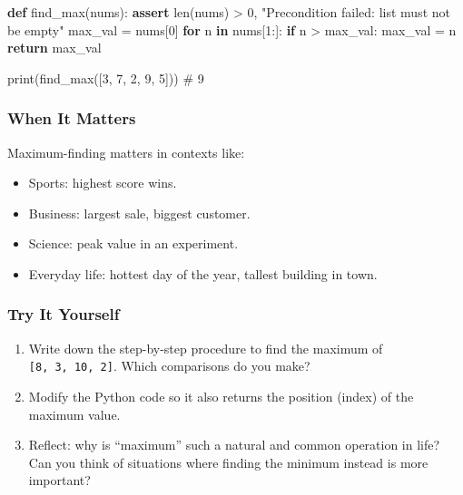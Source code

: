 \documentclass[
  letterpaper,
  DIV=11,
  numbers=noendperiod]{scrreprt}
\newenvironment{Shaded}{\begin{snugshade}}{\end{snugshade}}
\newcommand{\BuiltInTok}[1]{\textcolor[rgb]{0.00,0.23,0.31}{#1}}
\newcommand{\CommentTok}[1]{\textcolor[rgb]{0.37,0.37,0.37}{#1}}
\newcommand{\ControlFlowTok}[1]{\textcolor[rgb]{0.00,0.23,0.31}{\textbf{#1}}}
\newcommand{\DecValTok}[1]{\textcolor[rgb]{0.68,0.00,0.00}{#1}}
\newcommand{\KeywordTok}[1]{\textcolor[rgb]{0.00,0.23,0.31}{\textbf{#1}}}
\newcommand{\NormalTok}[1]{\textcolor[rgb]{0.00,0.23,0.31}{#1}}
\newcommand{\OperatorTok}[1]{\textcolor[rgb]{0.37,0.37,0.37}{#1}}
\newcommand{\StringTok}[1]{\textcolor[rgb]{0.13,0.47,0.30}{#1}}
\providecommand{\tightlist}{%
  \setlength{\itemsep}{0pt}\setlength{\parskip}{0pt}}
\begin{document}
\begin{Shaded}
\begin{Highlighting}[]
\KeywordTok{def}\NormalTok{ find\_max(nums):}
    \ControlFlowTok{assert} \BuiltInTok{len}\NormalTok{(nums) }\OperatorTok{\textgreater{}} \DecValTok{0}\NormalTok{, }\StringTok{"Precondition failed: list must not be empty"}
\NormalTok{    max\_val }\OperatorTok{=}\NormalTok{ nums[}\DecValTok{0}\NormalTok{]}
    \ControlFlowTok{for}\NormalTok{ n }\KeywordTok{in}\NormalTok{ nums[}\DecValTok{1}\NormalTok{:]:}
        \ControlFlowTok{if}\NormalTok{ n }\OperatorTok{\textgreater{}}\NormalTok{ max\_val:}
\NormalTok{            max\_val }\OperatorTok{=}\NormalTok{ n}
    \ControlFlowTok{return}\NormalTok{ max\_val}

\BuiltInTok{print}\NormalTok{(find\_max([}\DecValTok{3}\NormalTok{, }\DecValTok{7}\NormalTok{, }\DecValTok{2}\NormalTok{, }\DecValTok{9}\NormalTok{, }\DecValTok{5}\NormalTok{]))  }\CommentTok{\# 9}
\end{Highlighting}
\end{Shaded}

\subsubsection{When It Matters}\label{when-it-matters-91}

Maximum-finding matters in contexts like:

\begin{itemize}
\tightlist
\item
  Sports: highest score wins.
\item
  Business: largest sale, biggest customer.
\item
  Science: peak value in an experiment.
\item
  Everyday life: hottest day of the year, tallest building in town.
\end{itemize}

\subsubsection{Try It Yourself}\label{try-it-yourself-93}

\begin{enumerate}
\def\labelenumi{\arabic{enumi}.}
\tightlist
\item
  Write down the step-by-step procedure to find the maximum of
  \texttt{{[}8,\ 3,\ 10,\ 2{]}}. Which comparisons do you make?
\item
  Modify the Python code so it also returns the position (index) of the
  maximum value.
\item
  Reflect: why is ``maximum'' such a natural and common operation in
  life? Can you think of situations where finding the minimum instead is
  more important?
\end{enumerate}
\end{document}
